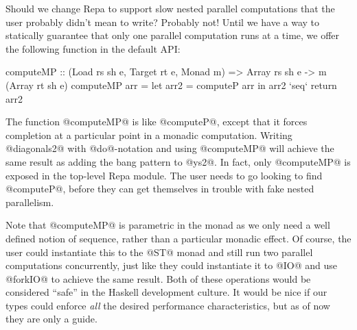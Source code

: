 Should we change Repa to support slow nested parallel computations that the user probably didn't mean to write? Probably not! Until we have a way to statically guarantee that only one parallel computation runs at a time, we offer the following function in the default API:
\par
\begin{small}
\begin{code}
 computeMP :: (Load  rs sh e, Target rt e, Monad m)
            => Array rs sh e -> m (Array rt sh e)
 computeMP arr
  = let arr2 = computeP arr
    in  arr2 `seq` return arr2
\end{code}
\end{small}
%
The function @computeMP@ is like @computeP@, except that it forces completion at a particular point in a monadic computation. Writing @diagonals2@ with @do@-notation and using @computeMP@ will achieve the same result as adding the bang pattern to @ys2@. In fact, only @computeMP@ is exposed in the top-level Repa module. The user needs to go looking to find @computeP@, before they can get themselves in trouble with fake nested parallelism.

Note that @computeMP@ is parametric in the monad as we only need a well defined notion of sequence, rather than a particular monadic effect. Of course, the user could instantiate this to the @ST@ monad and still run two parallel computations concurrently, just like they could instantiate it to @IO@ and use @forkIO@ to achieve the same result. Both of these operations would be considered ``safe'' in the Haskell development culture. It would be nice if our types could enforce \emph{all} the desired performance characteristics, but as of now they are only a guide.


